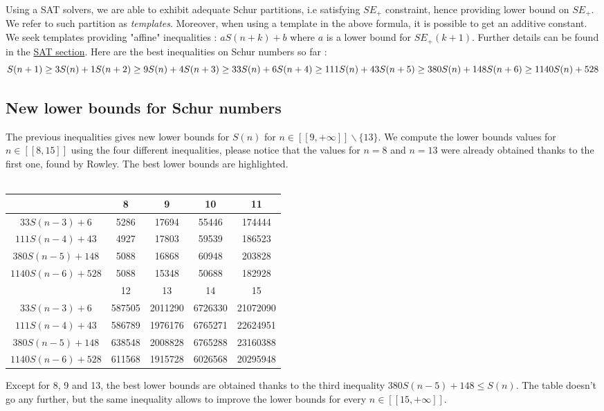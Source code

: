 Using a SAT solvers, we are able to exhibit adequate Schur partitions, i.e satisfying \(SE_+\) constraint, 
hence providing lower bound on \(SE_+\). We refer to such partition as \textit{templates}. Moreover, when using 
a template in the above formula, it is possible to get an additive constant. We seek templates providing "affine"
inequalities : \(aS(n+k) + b \) where \(a\) is a lower bound for \(SE_+(k+1)\). Further details can be found in the \hyperref[SAT]{SAT section}.
Here are the best inequalities on Schur numbers so far :
\[ S(n+1) \geq 3S(n) + 1 \\
 S(n+2) \geq 9S(n) + 4 \\
 S(n+3) \geq 33S(n) + 6 \\
 S(n+4) \geq 111S(n) + 43 \\
 S(n+5) \geq 380S(n) + 148 \\
 S(n+6) \geq 1140S(n) + 528 \]

\subsection{New lower bounds for Schur numbers}

The previous inequalities gives new lower bounds for \(S(n)\) for
\( n \in [\![9,+\infty]\!] \backslash \{13\} \). We compute the lower
bounds values for \( n \in [\![8,15]\!] \) using the four different inequalities, please notice that the values for \( n = 8\) and \(n = 13\) were already obtained thanks to the first one, found by Rowley. The best lower bounds are highlighted.\\
\\
\begin{center}
\begin{tabular}{|*{5}{c|}}
    \hline
	 & 8 & 9 & 10 & 11 \\
	\hline
	\(33S(n-3) + 6 \) & \cellcolor{yellow} 5286 & 17694 & 55446 & 174444\\
	\hline
	\(111S(n-4) + 43 \) & 4927 & \cellcolor{yellow} 17803 & 59539 & 186523\\
	\hline
	\(380S(n-5) + 148 \) & 5088 & 16868 & \cellcolor{yellow} 60948 & \cellcolor{yellow} 203828 \\
	\hline
	\(1140S(n-6) + 528 \) & 5088 & 15348 & 50688 & 182928\\
	\hline
	\hline
	& 12 & 13 & 14 & 15 \\
	\hline
	\(33S(n-3) + 6 \) & 587505 & \cellcolor{yellow} 2011290 & 6726330 & 21072090\\
	\hline
	\(111S(n-4) + 43 \) & 586789 & 1976176 & 6765271 & 22624951 \\
	\hline
	\(380S(n-5) + 148 \) & \cellcolor{yellow} 638548 & 2008828 & \cellcolor{yellow} 6765288 & \cellcolor{yellow} 23160388 \\
	\hline
	\(1140S(n-6) + 528 \) & 611568 & 1915728 & 6026568 & 20295948 \\
	\hline
\end{tabular}
\end{center}
Except for 8, 9 and 13, the best lower bounds are obtained thanks to the third inequality \( 380S(n-5) + 148 \leqslant S(n) \). The table doesn't go any further, but the same inequality allows to improve the lower bounds for every \( n \in [\![15,+\infty]\!] \).